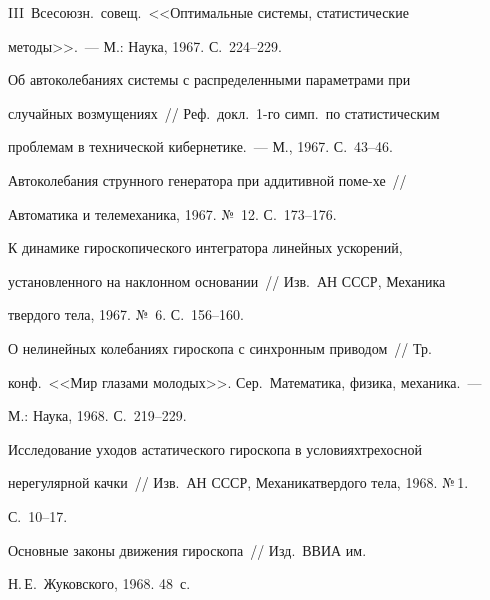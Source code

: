 III~Всесоюзн.\ совещ.\ <<Оптимальные системы, статистические


методы>>.~--- М.: Наука, 1967. С.~224--229.


\pagebreak





 Об автоколебаниях системы с распределенными па\-ра\-мет\-ра\-ми при


случайных возмущениях~// Реф.\ докл.\ 1-го симп.\ по статистическим


проблемам в технической кибернетике.~--- М., 1967. С.~43--46.





 Автоколебания струнного генератора при аддитивной поме-\linebreak хе~//


Автоматика и телемеханика, 1967. №\, 12. С.~173--176.





 К динамике гироскопического интегратора линейных ускорений,


установленного на наклонном основании~// Изв.\ АН СССР, Механика


твердого тела, 1967. №\, 6. С.~156--160.










 О нелинейных колебаниях гироскопа с синхронным приводом~// Тр.\


конф.\ <<Мир глазами молодых>>. Сер.\ Математика, физика, механика.~---


М.: Наука, 1968. С.~219--229.





 Исследование уходов астатического гироскопа в условиях\linebreak трехосной


нерегулярной качки~// Изв.\ АН СССР, Механика\linebreak твердого тела, 1968. №\,1.


С.~10--17.





 Основные законы движения гироскопа~// Изд.\ ВВИА им.\


Н.\,Е.~Жуковского, 1968. 48~с.





